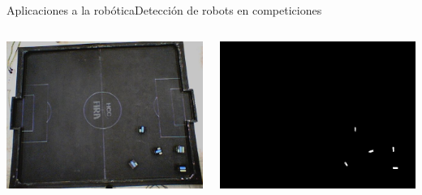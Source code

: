 \documentclass{beamer}
\begin{document}
\begin{frame}{Aplicaciones a la robótica}{Detección de robots en competiciones}
	\centering
\begin{columns}[c]
	\begin{column}{0.5\textwidth}
		\includegraphics[width=\textwidth]{detect1}
	\end{column}
	\begin{column}{0.5\textwidth}
		\includegraphics[width=\textwidth]{detect2}
	\end{column}
\end{columns}
\end{frame}
\end{document}
